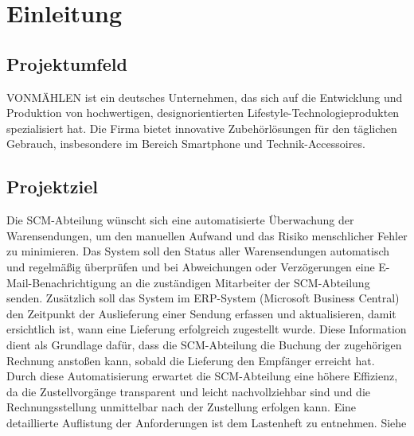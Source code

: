 \section{Einleitung}
\label{sec:Einleitung}

\subsection{Projektumfeld} 
\label{sec:Projektumfeld}
VONMÄHLEN ist ein deutsches Unternehmen, das sich auf die Entwicklung und Produktion von hochwertigen, 
designorientierten Lifestyle-Technologieprodukten spezialisiert hat. Die Firma bietet innovative Zubehörlösungen für den täglichen Gebrauch, 
insbesondere im Bereich Smartphone und Technik-Accessoires.

\subsection{Projektziel} 
\label{sec:Projektziel}
Die SCM-Abteilung wünscht sich eine automatisierte Überwachung der Warensendungen, um den manuellen Aufwand und das Risiko menschlicher Fehler zu minimieren. Das System soll den Status aller Warensendungen automatisch und regelmäßig überprüfen und bei Abweichungen oder Verzögerungen eine E-Mail-Benachrichtigung an die zuständigen Mitarbeiter der SCM-Abteilung senden.
Zusätzlich soll das System im ERP-System (Microsoft Business Central) den Zeitpunkt der Auslieferung einer Sendung erfassen und aktualisieren, damit ersichtlich ist, wann eine Lieferung erfolgreich zugestellt wurde. Diese Information dient als Grundlage dafür, dass die SCM-Abteilung die Buchung der zugehörigen Rechnung anstoßen kann, sobald die Lieferung den Empfänger erreicht hat. 
Durch diese Automatisierung erwartet die SCM-Abteilung eine höhere Effizienz, da die Zustellvorgänge transparent und leicht nachvollziehbar sind und die Rechnungsstellung unmittelbar nach der Zustellung erfolgen kann.
Eine detaillierte Auflistung der Anforderungen ist dem Lastenheft zu entnehmen. 
Siehe 


